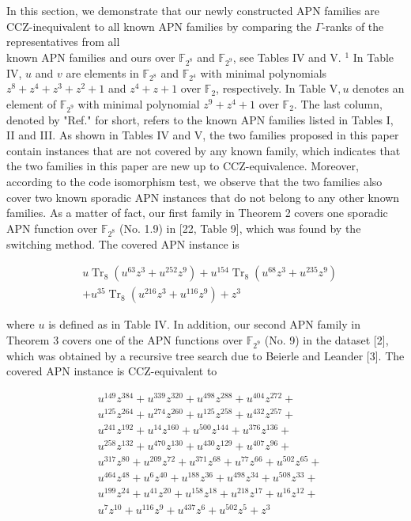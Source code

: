 \documentclass[10pt]{article}
\begin{document}
In this section, we demonstrate that our newly constructed APN families are CCZ-inequivalent to all known APN families by comparing the $\Gamma$-ranks of the representatives from all\\
known APN families and ours over $\mathbb{F}_{2^{8}}$ and $\mathbb{F}_{2^{9}}$, see Tables IV and V. ${ }^{1}$ In Table IV, $u$ and $v$ are elements in $\mathbb{F}_{2^{8}}$ and $\mathbb{F}_{2^{4}}$ with minimal polynomials $z^{8}+z^{4}+z^{3}+z^{2}+1$ and $z^{4}+z+1$ over $\mathbb{F}_{2}$, respectively. In Table $\mathrm{V}, u$ denotes an element of $\mathbb{F}_{2^{9}}$ with minimal polynomial $z^{9}+z^{4}+1$ over $\mathbb{F}_{2}$. The last column, denoted by "Ref." for short, refers to the known APN families listed in Tables I, II and III. As shown in Tables IV and V, the two families proposed in this paper contain instances that are not covered by any known family, which indicates that the two families in this paper are new up to CCZ-equivalence. Moreover, according to the code isomorphism test, we observe that the two families also cover two known sporadic APN instances that do not belong to any other known families. As a matter of fact, our first family in Theorem 2 covers one sporadic APN function over $\mathbb{F}_{2^{8}}$ (No. 1.9) in [22, Table 9], which was found by the switching method. The covered APN instance is

$$
\begin{aligned}
& u \operatorname{Tr}_{8}\left(u^{63} z^{3}+u^{252} z^{9}\right)+u^{154} \operatorname{Tr}_{8}\left(u^{68} z^{3}+u^{235} z^{9}\right) \\
& +u^{35} \operatorname{Tr}_{8}\left(u^{216} z^{3}+u^{116} z^{9}\right)+z^{3}
\end{aligned}
$$

where $u$ is defined as in Table IV. In addition, our second APN family in Theorem 3 covers one of the APN functions over $\mathbb{F}_{2^{9}}$ (No. 9) in the dataset [2], which was obtained by a recursive tree search due to Beierle and Leander [3]. The covered APN instance is CCZ-equivalent to

$$
\begin{aligned}
& u^{149} z^{384}+u^{339} z^{320}+u^{498} z^{288}+u^{404} z^{272}+ \\
& u^{125} z^{264}+u^{274} z^{260}+u^{125} z^{258}+u^{432} z^{257}+ \\
& u^{241} z^{192}+u^{14} z^{160}+u^{500} z^{144}+u^{376} z^{136}+ \\
& u^{258} z^{132}+u^{470} z^{130}+u^{430} z^{129}+u^{407} z^{96}+ \\
& u^{317} z^{80}+u^{209} z^{72}+u^{371} z^{68}+u^{77} z^{66}+u^{502} z^{65}+ \\
& u^{464} z^{48}+u^{6} z^{40}+u^{188} z^{36}+u^{498} z^{34}+u^{508} z^{33}+ \\
& u^{199} z^{24}+u^{41} z^{20}+u^{158} z^{18}+u^{218} z^{17}+u^{16} z^{12}+ \\
& u^{7} z^{10}+u^{116} z^{9}+u^{437} z^{6}+u^{502} z^{5}+z^{3}
\end{aligned}
$$
\end{document}
